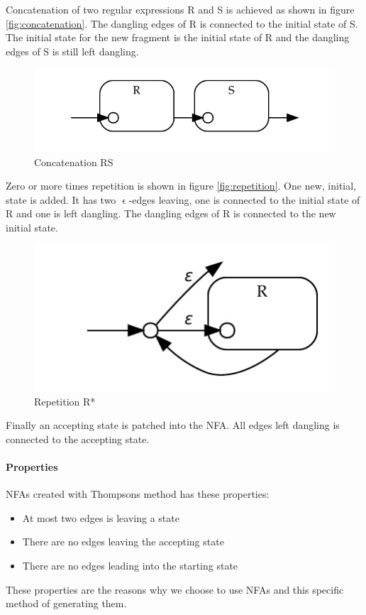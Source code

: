 Concatenation of two regular expressions R and S is achieved as shown
in figure \vref{fig:concatenation}. The dangling edges of R is
connected to the initial state of S. The initial state for the new
fragment is the initial state of R and the dangling edges of S is
still left dangling.

\begin{figure}
  \centering
  \includegraphics{parsing/concatenation}
  \caption{Concatenation RS}
  \label{fig:concatenation}
\end{figure}

Zero or more times repetition is shown in figure
\vref{fig:repetition}. One new, initial, state is added. It has two
$\upvarepsilon$-edges leaving, one is connected to the initial state of
R and one is left dangling. The dangling edges of R is connected to
the new initial state.

\begin{figure}
  \centering
  \includegraphics{parsing/repetition}
  \caption{Repetition R*}
  \label{fig:repetition}
\end{figure}

Finally an accepting state is patched into the NFA. All edges left
dangling is connected to the accepting state. 

\paragraph{Properties} NFAs created with Thompsons method has these
properties:
\begin{itemize}
  \item At most two edges is leaving a state
  \item There are no edges leaving the accepting state
  \item There are no edges leading into the starting state
\end{itemize}
These properties are the reasons why we choose to use NFAs and this
specific method of generating them.

